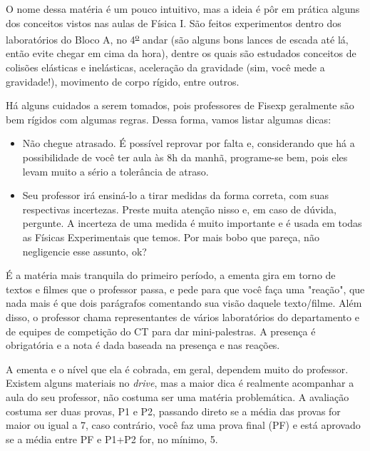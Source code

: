         
        O nome dessa matéria é um pouco intuitivo, mas a ideia é pôr em prática alguns dos conceitos vistos nas aulas de Física I. São feitos experimentos dentro dos laboratórios do Bloco A, no 4\textsuperscript{\underline{o}} andar (são alguns bons lances de escada até lá, então evite chegar em cima da hora), dentre os quais são estudados conceitos de colisões elásticas e inelásticas, aceleração da gravidade (sim, você mede a gravidade!), movimento de corpo rígido, entre outros.
        
        Há alguns cuidados a serem tomados, pois professores de Fisexp geralmente são bem rígidos com algumas regras. Dessa forma, vamos listar algumas dicas:
        
        \begin{itemize}
        	\item Não chegue atrasado. É possível reprovar por falta e, considerando que há a possibilidade de você ter aula às 8h da manhã, programe-se bem, pois eles levam muito a sério a tolerância de atraso.
            \item Seu professor irá ensiná-lo a tirar medidas da forma correta, com suas respectivas incertezas. Preste muita atenção nisso e, em caso de dúvida, pergunte. A incerteza de uma medida é muito importante e é usada em todas as Físicas Experimentais que temos. Por mais bobo que pareça, não negligencie esse assunto, ok?
        \end{itemize}
        	É a matéria mais tranquila do primeiro período, a ementa gira em torno de textos e filmes que o professor passa, e pede para que você faça uma "reação", que nada mais é que dois parágrafos comentando sua visão daquele texto/filme. Além disso, o professor chama representantes de vários laboratórios do departamento e de equipes de competição do CT para dar mini-palestras. A presença é obrigatória e a nota é dada baseada na presença e nas reações.
            
        	A ementa e o nível que ela é cobrada, em geral, dependem muito do professor. Existem alguns materiais no \textit{drive}, mas a maior dica é realmente acompanhar a aula do seu professor, não costuma ser uma matéria problemática. A avaliação costuma ser duas provas, P1 e P2, passando direto se a média das provas for maior ou igual a 7, caso contrário, você faz uma prova final (PF) e está aprovado se a média entre PF e P1+P2 for, no mínimo, 5.
     
